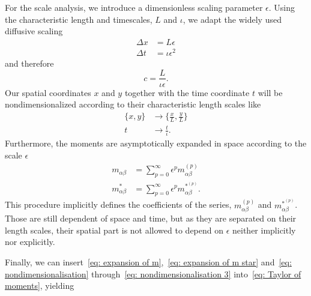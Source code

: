 For the scale analysis, we introduce a dimensionless scaling parameter $\epsilon$.
Using the characteristic length and timescales, $L$ and $\iota$, we adapt the widely used diffusive scaling
\begin{equation}
  \label{eq: nondimensionalisation}
  \begin{aligned}
    \Delta x & = L\epsilon \\
    \Delta t & = \iota\epsilon^2
  \end{aligned}
\end{equation}
and therefore
\begin{equation}
  \label{eq: nondimensionalisation 2}
  c = \frac{L}{\iota\epsilon}.
\end{equation}
Our spatial coordinates $x$ and $y$ together with the time coordinate $t$ will be nondimensionalized according to their characteristic length scales like
\begin{equation}
  \label{eq: nondimensionalisation 3}
  \begin{aligned}
    \{x, y\} & \rightarrow \{\frac{x}{L}, \frac{y}{L}\} \\
    t & \rightarrow \frac{t}{\iota}.
  \end{aligned}
\end{equation}
Furthermore, the moments are asymptotically expanded in space according to the scale $\epsilon$
\begin{align}
    \label{eq: expansion of m}
    m_{\alpha\beta} & = \sum_{p=0}^{\infty} \epsilon^p m_{\alpha\beta}^{(p)} \\
    \label{eq: expansion of m star}
    m^*_{\alpha\beta} & = \sum_{p=0}^{\infty} \epsilon^p m_{\alpha\beta}^{*^{(p)}}.
\end{align}
This procedure implicitly defines the coefficients of the series, $m_{\alpha\beta}^{(p)}$ and $m_{\alpha\beta}^{*^{(p)}}$.
Those are still dependent of space and time, but as they are separated on their length scales, their spatial part is not allowed to depend on $\epsilon$ neither implicitly nor explicitly.

Finally, we can insert~\eqref{eq: expansion of m},~\eqref{eq: expansion of m star} and~\eqref{eq: nondimensionalisation} through~\eqref{eq: nondimensionalisation 3} into~\eqref{eq: Taylor of moments}, yielding

